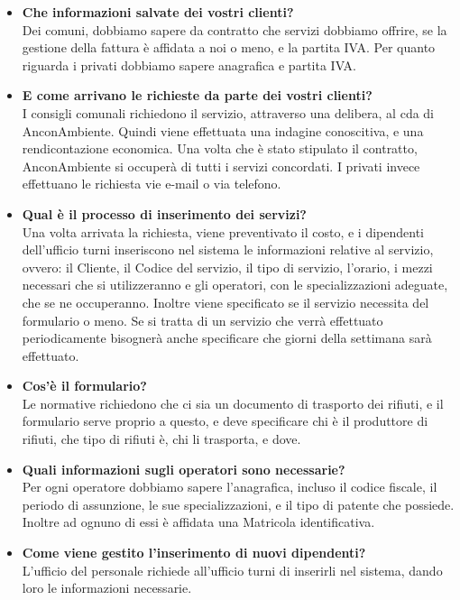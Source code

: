 \documentclass[green, fancy, 11pt]{elegantbook}
\begin{document}
\begin{itemize}
	\item \textbf{Che informazioni salvate dei vostri clienti?}\\
	Dei comuni, dobbiamo sapere da contratto che servizi dobbiamo offrire, se la gestione della fattura è affidata a noi o meno, e la partita IVA. Per quanto riguarda i privati dobbiamo sapere anagrafica e partita IVA.
	
	\item \textbf{E come arrivano le richieste da parte dei vostri clienti?}\\
	I consigli comunali richiedono il servizio, attraverso una delibera, al cda di AnconAmbiente. Quindi viene effettuata una
	indagine conoscitiva, e una rendicontazione economica. Una volta che è stato stipulato il contratto, AnconAmbiente si occuperà
	di tutti i servizi concordati. I privati invece effettuano le richiesta vie e-mail o via telefono.
	
	\item \textbf{Qual è il processo di inserimento dei servizi?}\\
	Una volta arrivata la richiesta, viene preventivato il costo, e i dipendenti dell'ufficio turni inseriscono nel sistema le informazioni relative al servizio, ovvero: il Cliente, il Codice del servizio, il tipo di servizio, l'orario, i mezzi necessari che si utilizzeranno e gli operatori, con le specializzazioni adeguate, che se ne occuperanno. Inoltre viene specificato se il servizio necessita del formulario o meno. Se si tratta di un servizio che verrà effettuato periodicamente bisognerà anche specificare che giorni della settimana sarà effettuato.
	
	\newpage
	\item \textbf{Cos'è il formulario?}\\
	Le normative richiedono che ci sia un documento di trasporto dei rifiuti, e il formulario serve proprio a questo, e deve specificare chi è il produttore di rifiuti, che tipo di rifiuti è, chi li trasporta, e dove.
	
	\item \textbf{Quali informazioni sugli operatori sono necessarie?}\\
	Per ogni operatore dobbiamo sapere l'anagrafica, incluso il codice fiscale, il periodo di assunzione, le sue specializzazioni, e il tipo di patente che possiede. Inoltre ad ognuno di essi è affidata una Matricola identificativa.
	
	\item \textbf{Come viene gestito l'inserimento di nuovi dipendenti?}\\
	L'ufficio del personale richiede all'ufficio turni di inserirli nel sistema, dando loro le informazioni necessarie.
	

\end{itemize}
\end{document}
